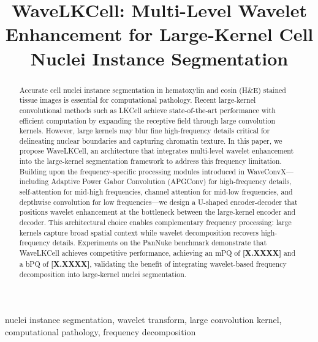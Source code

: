 \documentclass[conference]{IEEEtran}
\begin{document}
\title{WaveLKCell: Multi-Level Wavelet Enhancement for Large-Kernel Cell Nuclei Instance Segmentation}

\author{
}

\maketitle

\begin{abstract}
Accurate cell nuclei instance segmentation in hematoxylin and eosin (H\&E) stained tissue images is essential for computational pathology. Recent large-kernel convolutional methods such as LKCell achieve state-of-the-art performance with efficient computation by expanding the receptive field through large convolution kernels. However, large kernels may blur fine high-frequency details critical for delineating nuclear boundaries and capturing chromatin texture. In this paper, we propose WaveLKCell, an architecture that integrates multi-level wavelet enhancement into the large-kernel segmentation framework to address this frequency limitation. Building upon the frequency-specific processing modules introduced in WaveConvX---including Adaptive Power Gabor Convolution (APGConv) for high-frequency details, self-attention for mid-high frequencies, channel attention for mid-low frequencies, and depthwise convolution for low frequencies---we design a U-shaped encoder-decoder that positions wavelet enhancement at the bottleneck between the large-kernel encoder and decoder. This architectural choice enables complementary frequency processing: large kernels capture broad spatial context while wavelet decomposition recovers high-frequency details. Experiments on the PanNuke benchmark demonstrate that WaveLKCell achieves competitive performance, achieving an mPQ of \textbf{[X.XXXX]} and a bPQ of \textbf{[X.XXXX]}, validating the benefit of integrating wavelet-based frequency decomposition into large-kernel nuclei segmentation.
\end{abstract}

\begin{IEEEkeywords}
nuclei instance segmentation, wavelet transform, large convolution kernel, computational pathology, frequency decomposition
\end{IEEEkeywords}
\end{document}
